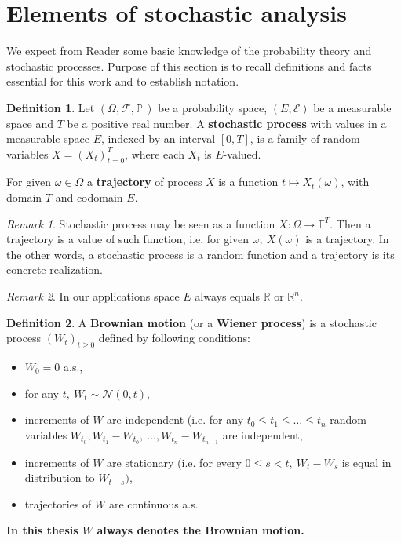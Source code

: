 \documentclass[a4paper,11pt, twoside]{book}
\theoremstyle{definition}
\newtheorem{mydef}{Definition}[chapter]
\theoremstyle{remark}
\newtheorem{remark}{Remark}[chapter]
\def\P{{\mathbb{P}}\,}
\def\R{{\mathbb{R}}}
\begin{document}
\section{Elements of stochastic analysis}
We expect from Reader some basic knowledge of the probability theory and stochastic processes. Purpose of this section is to recall definitions and facts essential for this work and to establish notation.

\begin{mydef}
 Let $(\Omega, \mathcal{F}, \P)$ be a probability space, $(E, \mathcal{E})$ be a measurable space and $T$ be a positive real number. A \textbf{stochastic process} with values in a measurable space $E$, indexed by an interval $[0,T]$, is a family of random variables $X = (X_t)_{t = 0}^T$, where each $X_t$ is $E$-valued.
 
 For given $\omega \in \Omega$ a \textbf{trajectory} of process $X$ is a function $t \mapsto X_t(\omega)$, with domain $T$ and codomain $E$.
\end{mydef}

\begin{remark}
 Stochastic process may be seen as a function $X: \Omega \rightarrow \mathbb{E}^T$. Then a trajectory is a value of such function, i.e. for given $\omega,\ X(\omega)$ is a trajectory. In the other words, a stochastic process is a random function and a trajectory is its concrete realization.
\end{remark}

\begin{remark}
 In our applications space $E$ always equals $\R$ or $\R^n$. 
\end{remark}

\begin{mydef}
 A \textbf{Brownian motion} (or a \textbf{Wiener process}) is a stochastic process $(W_t)_{t \geq 0}$ defined by following conditions:
 \begin{itemize}
  \item $W_0 = 0$ a.s.,
  \item for any $t,\ W_t \sim \mathcal{N}(0,t)$,
  \item increments of $W$ are independent (i.e. for any $t_0 \leq t_1 \leq \ldots \leq t_n$ random variables $W_{t_0}, W_{t_1} - W_{t_0},\ \ldots, W_{t_n} - W_{t_{n-1}}$ are independent,
  \item increments of $W$ are stationary (i.e. for every $0 \leq s < t,\ W_t-W_s$ is equal in distribution to $W_{t-s})$,
  \item trajectories of $W$ are continuous a.s.
 \end{itemize}
\end{mydef}
\noindent \textbf{In this thesis $W$ always denotes the Brownian motion.}
\end{document}
